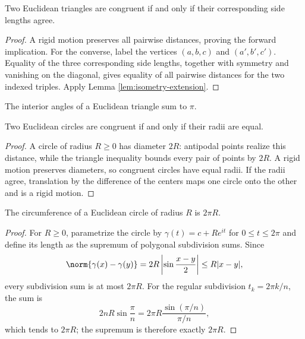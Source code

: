 \begin{theorem}
\label{thm:side-side-side}
\leanok
Two Euclidean triangles are congruent if and only if their corresponding side lengths agree.
\end{theorem}
\begin{proof}
\sketch A rigid motion preserves all pairwise distances, proving the forward implication. For the
converse, label the vertices $(a,b,c)$ and $(a',b',c')$. Equality of the three corresponding side
lengths, together with symmetry and vanishing on the diagonal, gives equality of all pairwise
distances for the two indexed triples. Apply Lemma \ref{lem:isometry-extension}.
\end{proof}

\begin{theorem}
\label{thm:angle-sum-theorem}
\mathlibok
The interior angles of a Euclidean triangle sum to $\pi$.
\end{theorem}

\begin{theorem}
\label{thm:circle-classification}
\leanok
Two Euclidean circles are congruent if and only if their radii are equal.
\end{theorem}
\begin{proof}
\sketch A circle of radius $R\geq0$ has diameter $2R$: antipodal points realize this distance, while the
triangle inequality bounds every pair of points by $2R$. A rigid motion preserves diameters, so
congruent circles have equal radii. If the radii agree, translation by the difference of the centers
maps one circle onto the other and is a rigid motion.
\end{proof}

\begin{theorem}
\label{thm:circumference-theorem}
\leanok
The circumference of a Euclidean circle of radius $R$ is $2\pi R$.
\end{theorem}
\begin{proof}
\sketch For $R\geq0$, parametrize the circle by $\gamma(t)=c+Re^{it}$ for $0\leq t\leq2\pi$ and define its
length as the supremum of polygonal subdivision sums. Since
\[
\norm{\gamma(x)-\gamma(y)}=2R\left|\sin\frac{x-y}{2}\right|\leq R|x-y|,
\]
every subdivision sum is at most $2\pi R$. For the regular subdivision $t_k=2\pi k/n$, the sum
is
\[
2nR\sin\frac{\pi}{n}=2\pi R\frac{\sin(\pi/n)}{\pi/n},
\]
which tends to $2\pi R$; the supremum is therefore exactly $2\pi R$.
\end{proof}

